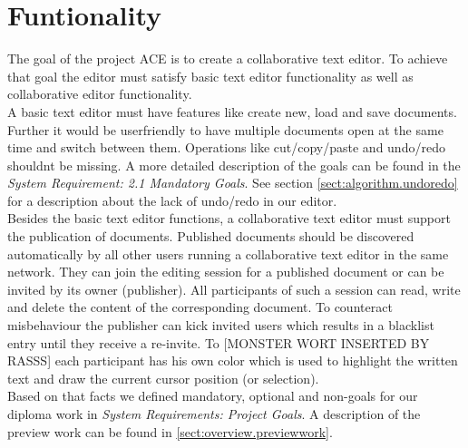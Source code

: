 \chapter{Funtionality}
\label{chapter:functionality}

The goal of the project ACE is to create a collaborative text editor. To achieve that goal the editor must satisfy basic text editor functionality as well as collaborative editor functionality.\\

A basic text editor must have features like create new, load and save documents. Further it would be userfriendly to have multiple documents open at the same time and switch between them. Operations like cut/copy/paste and undo/redo shouldnt be missing. A more detailed description of the goals can be found in the \textit{System Requirement: 2.1 Mandatory Goals}. See section \ref{sect:algorithm.undoredo} for a description about the lack of undo/redo in our editor.\\

Besides the basic text editor functions, a collaborative text editor must support the publication of documents. Published documents should be discovered automatically by all other users running a collaborative text editor in the same network. They can join the editing session for a published document or can be invited by its owner (publisher). All participants of such a session can read, write and delete the content of the corresponding document. To counteract misbehaviour the publisher can kick invited users which results in a blacklist entry until they receive a re-invite. To [MONSTER WORT INSERTED BY RASSS] each participant has his own color which is used to highlight the written text and draw the current cursor position (or selection).\\

Based on that facts we defined mandatory, optional and non-goals for our diploma work in \textit{System Requirements: Project Goals}. A description of the preview work can be found in \ref{sect:overview.previewwork}.
